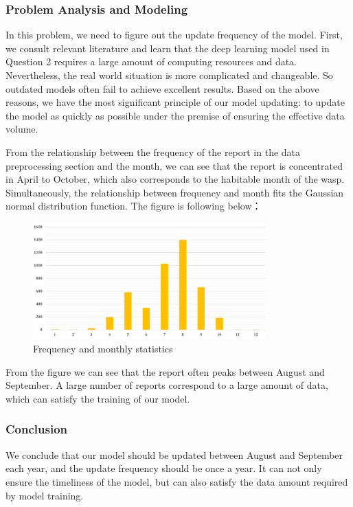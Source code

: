 \documentclass{mcmthesis}
\begin{document}
\subsubsection{Problem Analysis and Modeling}
In this problem, we need to figure out the update frequency of the model. First, we consult relevant literature and learn that the deep learning model used in Question 2 requires a large amount of computing resources and data.  Nevertheless, the real world situation is  more complicated and changeable. So outdated models often fail to achieve excellent results. Based on the above reasons, we have the most significant principle of our model updating: to update the model as quickly as possible under the premise of ensuring the effective data volume.

From the relationship between the frequency of the report in the data preprocessing section and the month, we can see that the report is concentrated in April to October, which also corresponds to the habitable month of the wasp. Simultaneously, the relationship between frequency and month fits the Gaussian normal distribution function. 
The figure is following below：

\begin{figure}[H]
	\centering
	\includegraphics[width=0.8\textwidth]{screenshot020}
	\caption{Frequency and monthly statistics}
	\label{fig:screenshot020}
\end{figure}

From the figure we can see that the report often peaks between August and September. 
A large number of reports correspond to a large amount of data, which can satisfy the training of our model. 

\hspace*{\fill}
\subsubsection{Conclusion}
We conclude that our model should be updated between August and September each year, and the update frequency should be once a year. It can not only ensure the timeliness of the model, but can also satisfy the data amount required by model training.
\end{document}
